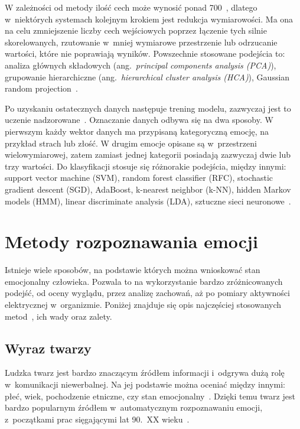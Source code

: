 W zależności od metody ilość cech może wynosić ponad 700~\cite{Wood2022}, dlatego w~niektórych systemach kolejnym krokiem jest redukcja wymiarowości.
Ma ona na celu zmniejszenie liczby cech wejściowych poprzez łączenie tych silnie skorelowanych, rzutowanie w~mniej wymiarowe przestrzenie lub odrzucanie wartości, które nie poprawiają wyników.
Powszechnie stosowane podejścia to: analiza głównych składowych (ang.~\textit{principal components analysis (PCA)}), grupowanie hierarchiczne (ang.~\textit{hierarchical cluster analysis (HCA)}), Gaussian random projection~\cite{Geron2019}.

Po uzyskaniu ostatecznych danych następuje trening modelu, zazwyczaj jest to uczenie nadzorowane~\cite{Russell2020}.
Oznaczanie danych odbywa się na dwa sposoby.
W pierwszym każdy wektor danych ma przypisaną kategoryczną emocję, na przykład strach lub złość.
W drugim emocje opisane są w~przestrzeni wielowymiarowej, zatem zamiast jednej kategorii posiadają zazwyczaj dwie lub trzy wartości.
Do klasyfikacji stosuje się różnorakie podejścia, między innymi: support vector machine (SVM), random forest classifier (RFC), stochastic gradient descent (SGD), AdaBoost, k-nearest neighbor (k-NN), hidden Markov models (HMM), linear discriminate analysis (LDA), sztuczne sieci neuronowe~\cite{Varghese2015, Dzedzickis2020, Ko2018}.

\section{Metody rozpoznawania emocji}
\label{sec:metody-rozpoznawania-emocji}

Istnieje wiele sposobów, na podstawie których można wnioskować stan emocjonalny człowieka.
Pozwala to na wykorzystanie bardzo zróżnicowanych podejść, od oceny wyglądu, przez analizę zachowań, aż po pomiary aktywności elektrycznej w~organizmie.
Poniżej znajduje się opis najczęściej stosowanych metod~\cite{Varghese2015, Dzedzickis2020}, ich wady oraz zalety.

\subsection{Wyraz twarzy}\label{subsec:wyraz-twarzy}
Ludzka twarz jest bardzo znaczącym źródłem informacji i~odgrywa dużą rolę w~komunikacji niewerbalnej.
Na jej podstawie można oceniać między innymi: płeć, wiek, pochodzenie etniczne, czy stan emocjonalny~\cite{Calvo2015}.
Dzięki temu twarz jest bardzo popularnym źródłem w~automatycznym rozpoznawaniu emocji, z~początkami prac sięgającymi lat 90.\ XX wieku~\cite{Calvo2015}.

